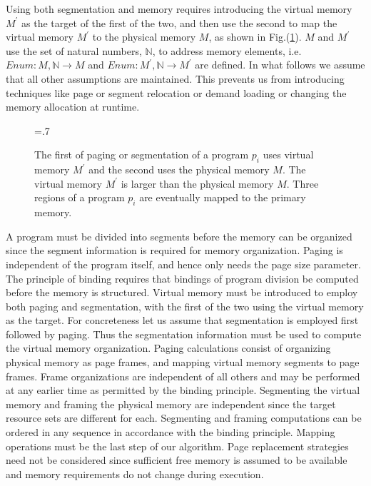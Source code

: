 \documentclass[draft]{article}
\def\figdir{.}
\begin{document}
Using both  segmentation and  memory requires introducing  the virtual
memory $M^\prime$ as the target of  the first of the two, and then use
the second to map the virtual memory $M^\prime$ to the physical memory
$M$,  as   shown  in  Fig.(\ref{fig:paging:segmentation}).    $M$  and
$M^\prime$ use  the set of  natural numbers, $\mathbb{N}$,  to address
memory elements,  i.e. $Enum: M, \mathbb{N} \rightarrow  M$ and $Enum:
M^\prime,  \mathbb{N}  \rightarrow  M^\prime$  are defined.   In  what
follows  we assume that  all other  assumptions are  maintained.  This
prevents  us   from  introducing  techniques  like   page  or  segment
relocation  or demand  loading or  changing the  memory  allocation at
runtime.
\begin{figure}[ht]
  \centering
  \epsfxsize=.7\textwidth
  \epsffile{\figdir/pg-seg-algo-2.eps}
  \caption[Paging   and   Segmentation]{The   first   of   paging   or
    segmentation of a program $p_i$ uses virtual memory $M^\prime$ and
    the  second uses  the  physical memory  $M$.   The virtual  memory
    $M^\prime$ is larger than  the physical memory $M$.  Three regions
    of a program $p_i$ are eventually mapped to the primary memory.}
  \label{fig:paging:segmentation}
\end{figure}

A  program must  be divided  into segments  before the  memory  can be
organized  since  the  segment  information  is  required  for  memory
organization.  Paging is independent  of the program itself, and hence
only needs the page size parameter.  The principle of binding requires
that bindings  of program  division be computed  before the  memory is
structured.  Virtual  memory must be introduced to  employ both paging
and segmentation, with  the first of the two  using the virtual memory
as the  target.  For concreteness  let us assume that  segmentation is
employed first followed by  paging.  Thus the segmentation information
must  be used  to  compute the  virtual  memory organization.   Paging
calculations consist of organizing physical memory as page frames, and
mapping virtual  memory segments to page  frames.  Frame organizations
are independent of all others and may be performed at any earlier time
as permitted by the  binding principle.  Segmenting the virtual memory
and  framing the  physical  memory are  independent  since the  target
resource  sets  are  different   for  each.   Segmenting  and  framing
computations can  be ordered  in any sequence  in accordance  with the
binding principle.   Mapping operations must  be the last step  of our
algorithm.  Page  replacement strategies need not  be considered since
sufficient  free  memory  is   assumed  to  be  available  and  memory
requirements do not change during execution.
\end{document}
